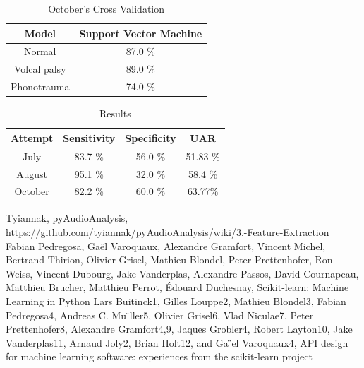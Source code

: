 \documentclass[conference]{IEEEtran}
\begin{document}
\begin{table}[htbp]
	\caption{October's Cross Validation}
	\begin{center}
		\begin{tabular}{|c|c|}
			\hline
			Model & Support Vector Machine \\
			\hline
			Normal & 87.0 \% \\
			\hline
			Volcal palsy & 89.0 \% \\
			\hline
			Phonotrauma & 74.0 \% \\
			\hline
		\end{tabular}
		\label{tab2}
	\end{center}
\end{table}



\begin{table}[htbp]
	\caption{Results}
	\begin{center}
		\begin{tabular}{|c|c|c|c|}
			\hline
			Attempt & Sensitivity & Specificity & UAR \\ 
			\hline
			July & 83.7 \% & 56.0 \% & 51.83 \% \\
			\hline
			August & 95.1 \% &  32.0 \% & 58.4 \% \\  
			\hline
			October & 82.2 \% & 60.0 \% & 63.77\% \\
			\hline
		\end{tabular}
		\label{tab3}
	\end{center}
\end{table}
		

\begin{thebibliography}{00}
 Tyiannak, pyAudioAnalysis, https://github.com/tyiannak/pyAudioAnalysis/wiki/3.-Feature-Extraction
 Fabian Pedregosa, Gaël Varoquaux, Alexandre Gramfort, Vincent Michel, Bertrand Thirion, Olivier Grisel, Mathieu Blondel, Peter Prettenhofer, Ron Weiss, Vincent Dubourg, Jake Vanderplas, Alexandre Passos, David Cournapeau, Matthieu Brucher, Matthieu Perrot, Édouard Duchesnay, Scikit-learn: Machine Learning in Python
 Lars Buitinck1, Gilles Louppe2, Mathieu Blondel3, Fabian Pedregosa4, Andreas C. Mu ̈ller5, Olivier Grisel6, Vlad Niculae7, Peter Prettenhofer8, Alexandre Gramfort4,9, Jaques Grobler4, Robert Layton10, Jake Vanderplas11, Arnaud Joly2, Brian Holt12, and Ga ̈el Varoquaux4, API design for machine learning software: experiences from the scikit-learn project
\end{thebibliography}
\end{document}
